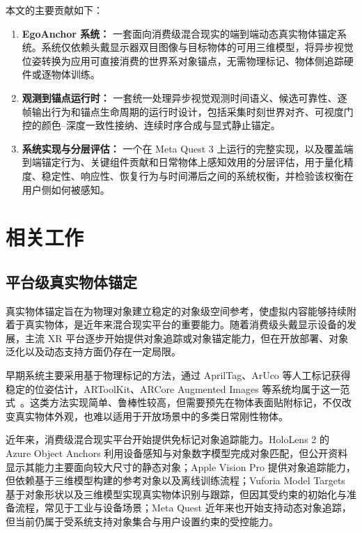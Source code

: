 \documentclass[review]{vgtc}
\begin{document}
本文的主要贡献如下：

\begin{enumerate}
  \item \textbf{EgoAnchor 系统：} 一套面向消费级混合现实的端到端动态真实物体锚定系统。系统仅依赖头戴显示器双目图像与目标物体的可用三维模型，将异步视觉位姿转换为应用可直接消费的世界系对象锚点，无需物理标记、物体侧追踪硬件或逐物体训练。
  \item \textbf{观测到锚点运行时：} 一套统一处理异步视觉观测时间语义、候选可靠性、逐帧输出行为和锚点生命周期的运行时设计，包括采集时刻世界对齐、可视度门控的颜色--深度一致性接纳、连续时序合成与显式静止锚定。
  \item \textbf{系统实现与分层评估：} 一个在 Meta Quest 3 上运行的完整实现，以及覆盖端到端锚定行为、关键组件贡献和日常物体上感知效用的分层评估，用于量化精度、稳定性、响应性、恢复行为与时间滞后之间的系统权衡，并检验该权衡在用户侧如何被感知。
\end{enumerate}

\section{相关工作}\label{sec:related-work}


\subsection{平台级真实物体锚定}


真实物体锚定旨在为物理对象建立稳定的对象级空间参考，使虚拟内容能够持续附着于真实物体，是近年来混合现实平台的重要能力。随着消费级头戴显示设备的发展，主流 XR 平台逐步开始提供对象追踪或对象锚定能力，但在开放部署、对象泛化以及动态支持方面仍存在一定局限。

早期系统主要采用基于物理标记的方法，通过 AprilTag、ArUco 等人工标记获得稳定的位姿估计，ARToolKit、ARCore Augmented Images 等系统均属于这一范式~\cite{kato1999artoolkit,olson2011apriltag,garridojurado2014aruco,googleArcoreAugmentedImages}。这类方法实现简单、鲁棒性较高，但需要预先在物体表面贴附标记，不仅改变真实物体外观，也难以适用于开放场景中的多类日常刚性物体。

近年来，消费级混合现实平台开始提供免标记对象追踪能力。HoloLens 2 的 Azure Object Anchors 利用设备感知与对象数字模型完成对象匹配，但公开资料显示其能力主要面向较大尺寸的静态对象；Apple Vision Pro 提供对象追踪能力，但依赖基于三维模型构建的参考对象以及离线训练流程；Vuforia Model Targets 基于对象形状以及三维模型实现真实物体识别与跟踪，但因其受约束的初始化与准备流程，常见于工业与设备场景；Meta Quest 近年来也开始支持动态对象追踪，但当前仍属于受系统支持对象集合与用户设置约束的受控能力。
\end{document}
